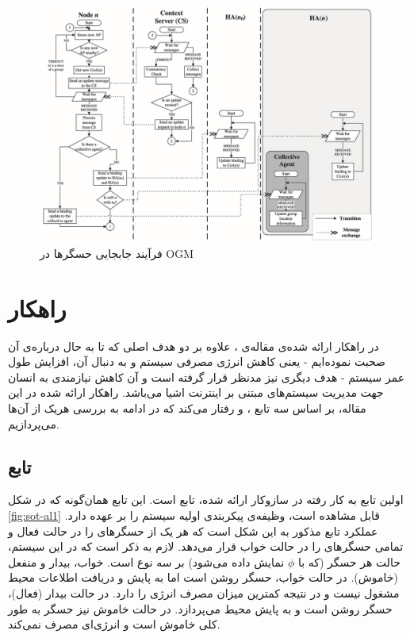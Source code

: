 \begin{figure}
	\centering
	\includegraphics[width=0.9\linewidth]{figs/ogm-proc}
	\caption {فرآیند جابجایی حسگرها در OGM}
	\label{fig:ogm-proc}
\end{figure}

\section{راهکار  }
در راهکار ارائه شده‌ی مقاله‌ی \cite{}، علاوه بر دو هدف اصلی که تا به حال درباره‌ی آن صحبت نموده‌ایم - یعنی کاهش انرژی مصرفی سیستم و به دنبال آن، افزایش طول عمر سیستم - هدف دیگری نیز مدنظر قرار گرفته است و آن کاهش نیازمندی به انسان جهت مدیریت سیستم‌های مبتنی بر اینترنت اشیا می‌باشد.
راهکار ارائه شده در این مقاله، بر اساس سه تابع ، 
 و 
رفتار می‌کند که در ادامه به بررسی هریک از آن‌ها می‌پردازیم.

\subsection{تابع }
اولین تابع به کار رفته در سازوکار ارائه شده، تابع  است. این تابع همان‌گونه که در شکل \ref{fig:sot-al1} قابل مشاهده است، وظیفه‌ی پیکربندی اولیه سیستم را بر عهده دارد. عملکرد تابع مذکور به این شکل است که هر یک از حسگر‌های  را در حالت فعال و تمامی حسگرهای  را در حالت خواب قرار می‌دهد. لازم به ذکر است که در این سیستم، حالت هر حسگر (که با $\phi$ نمایش داده می‌شود) بر سه نوع است. خواب، بیدار و منفعل (خاموش). در حالت خواب، حسگر روشن است اما به پایش و دریافت اطلاعات محیط مشغول نیست و در نتیجه کمترین میزان مصرف انرژی را دارد. در حالت بیدار (فعال)، حسگر روشن است و به پایش محیط می‌پردازد. در حالت خاموش نیز حسگر به طور کلی خاموش است و انرژی‌ای مصرف نمی‌کند.

